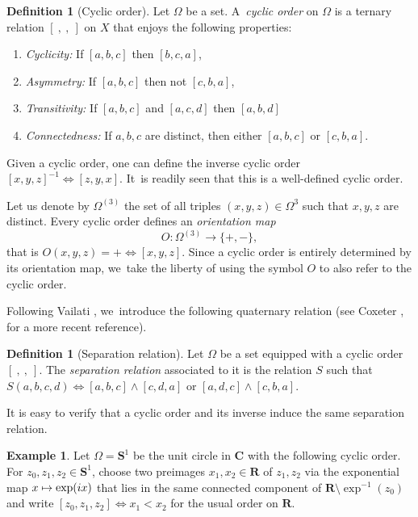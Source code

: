 \documentclass[JEP,XML,SOM,Unicode,NoFloatCountersInSection,published]{cedram}
\newcommand\mto{\mathchoice{\longmapsto}{\mapsto}{\mapsto}{\mapsto}}
\theoremstyle{plain}
\theoremstyle{definition}
\newtheorem{definition}[theorem]{Definition}
\newtheorem{example}[theorem]{Example}
\theoremstyle{remark}
\begin{document}
\begin{definition}[Cyclic order]
\label{def.cyclic.order}
Let $\Omega$ be a set. A~\emph{cyclic order} on $\Omega$ is a ternary relation $[\ ,\ ,\ ]$ on $X$ that enjoys the following properties:
\begin{enumerate}
\item \emph{Cyclicity:} If $[a, b, c]$ then $[b, c, a]$,
\item\emph{Asymmetry:} If $[a, b, c]$ then not $[c, b, a]$,
\item\emph{Transitivity:} If $[a, b, c]$ and $[a, c, d]$ then $[a, b, d]$
\item\emph{Connectedness:} If $a, b,c$ are distinct, then either $[a, b, c]$ or $[c, b, a]$.
\end{enumerate}
\end{definition}

Given a cyclic order, one can define the inverse cyclic order $[x,y,z]^{-1}\iff[z,y,x]$. It~is readily seen that this is a well-defined cyclic order.

Let us denote by $\Omega^{(3)}$ the set of all triples $(x,y,z) \in \Omega^3$ such that $x,y,z$ are distinct.
Every cyclic order defines an \emph{orientation map}
\[
 O \colon \Omega^{(3)} \to \{+,-\}, 
\]
that is $O(x,y,z)=+ \iff [x,y,z]$.
Since a cyclic order is entirely determined by its orientation map, we~take the liberty of using the symbol $O$ to also refer to the cyclic order.

Following Vailati \cite[\S204, p.\,215]{Russel}, we~introduce the following quaternary relation (see Coxeter \cite[Ch.\,3]{Coxeter}, for a more recent reference).

\begin{definition}[Separation relation]
\label{def.separation.relation}
Let $\Omega$ be a set equipped with a cyclic order $[\ ,\ ,\ ]$.
The \emph{separation relation} associated to it is the relation $S$ such that $S(a,b,c,d) \iff [a,b,c]\wedge [c,d,a]$ or $[a,d,c]\wedge [c,b,a]$.
\end{definition}

It is easy to verify that a cyclic order and its inverse induce the same separation relation.

\begin{example}
Let $\Omega=\mathbf{S}^1$ be the unit circle in $\mathbf{C}$ with the following cyclic order.
For $z_0,z_1,z_2\in \mathbf{S}^1$, choose two preimages $x_1,x_2\in\mathbf{R}$ of $z_1,z_2$ via the exponential map $x\mto \exp(ix)$ that lies in the same connected component of $\mathbf{R}\setminus\exp^{-1}(z_0)$ and write $[z_0,z_1,z_2]\iff x_1<x_2$ for the usual order on $\mathbf{R}$.
\end{example}
\end{document}
